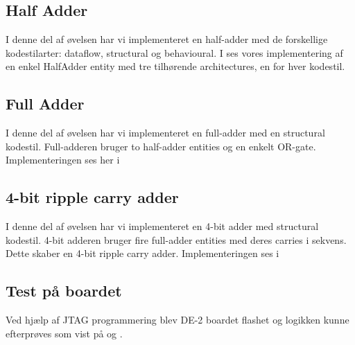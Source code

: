 \subsection{Half Adder}

I denne del af øvelsen har vi implementeret en half-adder med de forskellige
kodestilarter: dataflow, structural og behavioural. I  ses
vores implementering af en enkel HalfAdder entity med tre tilhørende
architectures, en for hver kodestil.


\subsection{Full Adder}

I denne del af øvelsen har vi implementeret en full-adder med en structural
kodestil. Full-adderen bruger to half-adder entities og en enkelt OR-gate.
Implementeringen ses her i 


\subsection{4-bit ripple carry adder}

I denne del af øvelsen  har vi implementeret en 4-bit adder med structural
kodestil. 4-bit adderen bruger fire full-adder entities med deres carries i
sekvens. Dette skaber en 4-bit ripple carry adder. Implementeringen ses i 


\subsection{Test på boardet}

Ved hjælp af JTAG programmering blev DE-2 boardet flashet og logikken kunne
efterprøves som vist på  og .
